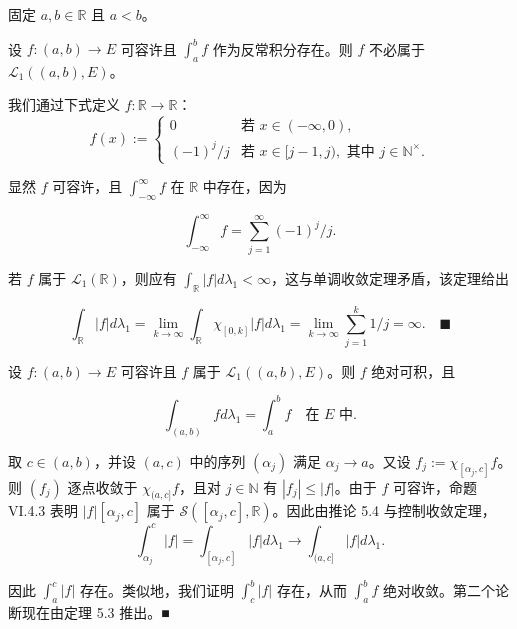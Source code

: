 \begin{remark}

固定 $ a,b \in \mathbb{R} $ 且 $ a < b $。

\begin{items}
\item

设 $ f: (a,b) \to E $ 可容许且 $ \int_{a}^{b} f $ 作为反常积分存在。则 $ f $ 不必属于 $ \mathcal{L}_{1}((a,b),E) $。

\proofhead
我们通过下式定义 $ f: \mathbb{R} \to \mathbb{R} $：
\begin{equation*}
f(x) := \begin{cases} 0 & \text{若 } x \in (-\infty,0), \\ (-1)^{j}/j & \text{若 } x \in [j-1,j), \text{ 其中 } j \in \mathbb{N}^{\times} . \end{cases}
\end{equation*}

显然 $ f $ 可容许，且 $ \int_{-\infty}^{\infty} f $ 在 $ \mathbb{R} $ 中存在，因为

\[
\int_{-\infty}^{\infty} f = \sum_{j=1}^{\infty} (-1)^{j}/j .
\]

若 $ f $ 属于 $ \mathcal{L}_{1}(\mathbb{R}) $，则应有 $ \int_{\mathbb{R}} |f| d\lambda_{1} < \infty $，这与单调收敛定理矛盾，该定理给出

\[
\int_{\mathbb{R}} |f| d\lambda_{1} = \lim_{k \to \infty} \int_{\mathbb{R}} \chi_{[0,k]}|f| d\lambda_{1} = \lim_{k \to \infty} \sum_{j=1}^{k} 1/j = \infty . \quad \text{■}
\]
\item

设 $ f: (a,b) \to E $ 可容许且 $ f $ 属于 $ \mathcal{L}_{1}((a,b),E) $。则 $ f $ 绝对可积，且

\[
\int_{(a,b)} f d\lambda_{1} = \int_{a}^{b} f \quad \text{在 } E \text{ 中} .
\]

\proofhead
取 $ c \in (a,b) $，并设 $ (a,c) $ 中的序列 $ (\alpha_{j}) $ 满足 $ \alpha_{j} \to a $。又设 $ f_{j} := \chi_{[\alpha_{j},c]}f $。则 $ (f_{j}) $ 逐点收敛于 $ \chi_{(a,c]}f $，且对 $ j \in \mathbb{N} $ 有 $ |f_{j}| \le |f| $。由于 $ f $ 可容许，命题 VI.4.3 表明 $ |f|[\alpha_{j},c] $ 属于 $ \mathcal{S}([\alpha_{j},c],\mathbb{R}) $。因此由推论 5.4 与控制收敛定理，
\[
\int_{\alpha_{j}}^{c} |f| = \int_{[\alpha_{j},c]} |f| d\lambda_{1} \to \int_{(a,c]} |f| d\lambda_{1} .
\]

因此 $ \int_{a}^{c} |f| $ 存在。类似地，我们证明 $ \int_{c}^{b} |f| $ 存在，从而 $ \int_{a}^{b} f $ 绝对收敛。第二个论断现在由定理 5.3 推出。\nobreak\hspace{0.35em}■


\end{items}
\end{remark}
